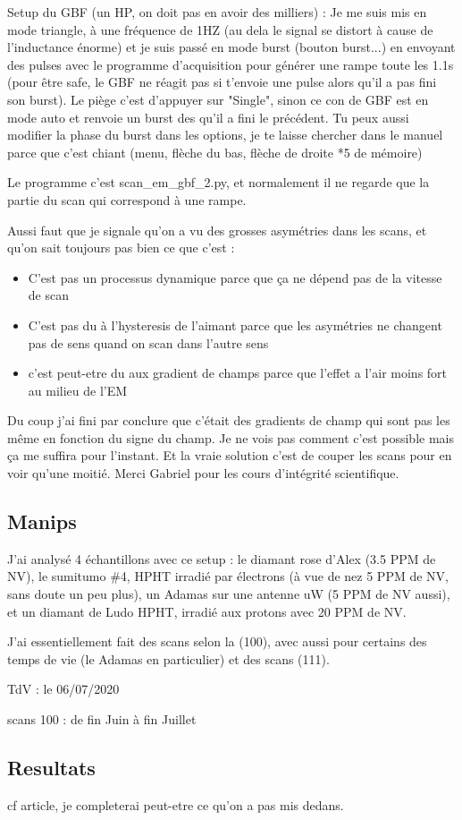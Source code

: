 \documentclass[a4paper]{report}
\begin{document}
  Setup du GBF (un HP, on doit pas en avoir des milliers) : Je me suis mis en mode triangle, à une fréquence de 1HZ (au dela le signal se distort à cause de l'inductance énorme) et je suis passé en mode burst (bouton burst...) en envoyant des pulses avec le programme d'acquisition pour générer une rampe toute les 1.1s (pour être safe, le GBF ne réagit pas si t'envoie une pulse alors qu'il a pas fini son burst). Le piège c'est d'appuyer sur "Single", sinon ce con de GBF est en mode auto et renvoie un burst des qu'il a fini le précédent. Tu peux aussi modifier la phase du burst dans les options, je te laisse chercher dans le manuel parce que c'est chiant (menu, flèche du bas, flèche de droite *5 de mémoire)
  
  Le programme c'est scan\_em\_gbf\_2.py, et normalement il ne regarde que la partie du scan qui correspond à une rampe.
  
  Aussi faut que je signale qu'on a vu des grosses asymétries dans les scans, et qu'on sait toujours pas bien ce que c'est :
 \begin{itemize}
 \item C'est pas un processus dynamique parce que ça ne dépend pas de la vitesse de scan
 \item C'est pas du à l'hysteresis de l'aimant parce que les asymétries ne changent pas de sens quand on scan dans l'autre sens
 \item c'est peut-etre du aux gradient de champs parce que l'effet a l'air moins fort au milieu de l'EM
 \end{itemize}
 Du coup j'ai fini par conclure que c'était des gradients de champ qui sont pas les même en fonction du signe du champ. Je ne vois pas comment c'est possible mais ça me suffira pour l'instant. Et la vraie solution c'est de couper les scans pour en voir qu'une moitié. Merci Gabriel pour les cours d'intégrité scientifique.
 
 \subsection{Manips}
 J'ai analysé 4 échantillons avec ce setup : le diamant rose d'Alex (3.5 PPM de NV), le sumitumo \#4, HPHT irradié par électrons (à vue de nez 5 PPM de NV, sans doute un peu plus), un Adamas sur une antenne uW (5 PPM de NV aussi), et un diamant de Ludo HPHT, irradié aux protons avec 20 PPM de NV. 
 
 J'ai essentiellement fait des scans selon la (100), avec aussi pour certains des temps de vie (le Adamas en particulier) et des scans (111).
 
 TdV : le 06/07/2020
 
 scans 100 : de fin Juin à fin Juillet
 
 \subsection{Resultats}
 cf article, je completerai peut-etre ce qu'on a pas mis dedans.
  
\end{document}
